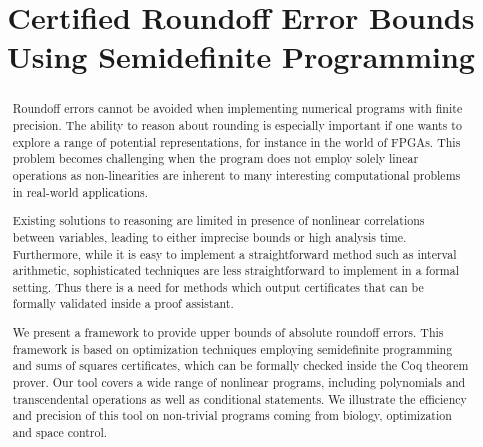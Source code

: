 \documentclass[preprint,fleqn,nocopyrightspace]{sigplanconf}
\theoremstyle{plain}
\begin{document}





\title{Certified Roundoff Error Bounds Using Semidefinite Programming}


\authorinfo{}{}{}

\maketitle

\begin{abstract}

Roundoff errors cannot be avoided when implementing numerical programs with finite precision.         
The ability to reason about rounding is especially important if one wants to explore a range of potential representations, for instance in the world of FPGAs. This problem becomes challenging when the program does not employ solely linear operations as non-linearities are inherent to many interesting computational problems in real-world applications. 

Existing solutions to reasoning are limited in presence of nonlinear correlations between variables, leading to either imprecise bounds or high analysis time. Furthermore, while it is easy to implement a straightforward method such as interval arithmetic, sophisticated techniques are less straightforward to implement in a formal setting. Thus there is a need for methods which output certificates that can be formally  validated inside a proof assistant.

We present a framework to provide upper bounds of absolute roundoff errors. This framework is based on optimization techniques employing  semidefinite programming and sums of squares certificates, which can be formally checked inside the Coq theorem prover.
Our tool covers a wide range of nonlinear programs, including polynomials and transcendental operations as well as conditional statements.                                                             We illustrate the efficiency and  precision of this tool on non-trivial programs coming from biology, optimization and space control.
\end{abstract}
\end{document}
